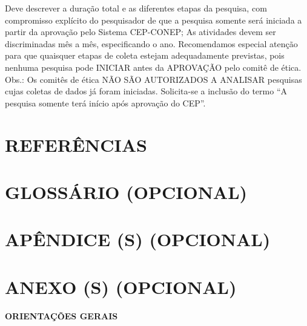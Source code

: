 \documentclass[
  brazilian,
  12pt,
  letterpaper,
  DIV=11,
  numbers=noendperiod]{scrartcl}
\begin{document}
Deve descrever a duração total e as diferentes etapas da pesquisa, com
compromisso explícito do pesquisador de que a pesquisa somente será
iniciada a partir da aprovação pelo Sistema CEP-CONEP; As atividades
devem ser discriminadas mês a mês, especificando o ano. Recomendamos
especial atenção para que quaisquer etapas de coleta estejam
adequadamente previstas, pois nenhuma pesquisa pode INICIAR antes da
APROVAÇÃO pelo comitê de ética. Obs.: Os comitês de ética NÃO SÃO
AUTORIZADOS A ANALISAR pesquisas cujas coletas de dados já foram
iniciadas. Solicita-se a inclusão do termo ``A pesquisa somente terá
início após aprovação do CEP''.

\clearpage

\section{REFERÊNCIAS}\label{referuxeancias}

\protect{}\label{refs}

\clearpage

\section{GLOSSÁRIO (OPCIONAL)}\label{glossuxe1rio-opcional}

\clearpage

\section{APÊNDICE (S) (OPCIONAL)}\label{apuxeandice-s-opcional}

\clearpage

\section{ANEXO (S) (OPCIONAL)}\label{anexo-s-opcional}

\clearpage

\textbf{ORIENTAÇÕES GERAIS}
\end{document}
